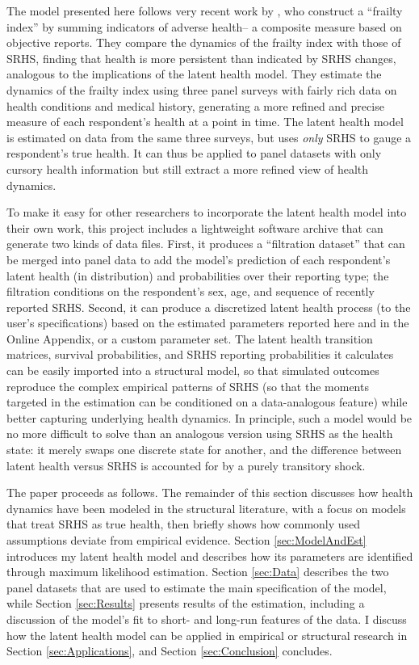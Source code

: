 \documentclass[12pt,pdftex,letterpaper]{article}
\begin{document}
The model presented here follows very recent work by \cite{HosseiniZhao21a}, who construct a ``frailty index'' by summing indicators of adverse health-- a composite measure based on objective reports. They compare the dynamics of the frailty index with those of SRHS, finding that health is more persistent than indicated by SRHS changes, analogous to the implications of the latent health model. They estimate the dynamics of the frailty index using three panel surveys with fairly rich data on health conditions and medical history, generating a more refined and precise measure of each respondent's health at a point in time. The latent health model is estimated on data from the same three surveys, but uses \textit{only} SRHS to gauge a respondent's true health. It can thus be applied to panel datasets with only cursory health information but still extract a more refined view of health dynamics.

To make it easy for other researchers to incorporate the latent health model into their own work, this project includes a lightweight software archive that can generate two kinds of data files. First, it produces a ``filtration dataset'' that can be merged into panel data to add the model's prediction of each respondent's latent health (in distribution) and probabilities over their reporting type; the filtration conditions on the respondent's sex, age, and sequence of recently reported SRHS. Second, it can produce a discretized latent health process (to the user's specifications) based on the estimated parameters reported here and in the Online Appendix, or a custom parameter set. The latent health transition matrices, survival probabilities, and SRHS reporting probabilities it calculates can be easily imported into a structural model, so that simulated outcomes reproduce the complex empirical patterns of SRHS (so that the moments targeted in the estimation can be conditioned on a data-analogous feature) while better capturing underlying health dynamics. In principle, such a model would be no more difficult to solve than an analogous version using SRHS as the health state: it merely swaps one discrete state for another, and the difference between latent health versus SRHS is accounted for by a purely transitory shock.

The paper proceeds as follows.  The remainder of this section discusses how health dynamics have been modeled in the structural literature, with a focus on models that treat SRHS as true health, then briefly shows how commonly used assumptions deviate from empirical evidence. Section \ref{sec:ModelAndEst} introduces my latent health model and describes how its parameters are identified through maximum likelihood estimation.  Section \ref{sec:Data} describes the two panel datasets that are used to estimate the main specification of the model, while Section \ref{sec:Results} presents results of the estimation, including a discussion of the model's fit to short- and long-run features of the data. I discuss how the latent health model can be applied in empirical or structural research in Section \ref{sec:Applications}, and Section \ref{sec:Conclusion} concludes.
\end{document}
